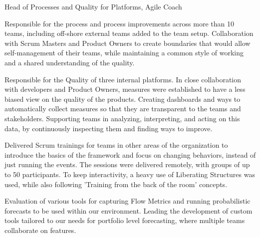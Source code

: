 \begin{cventries}
	\cventry
	{
		{			}
		{Head of Processes and Quality for Platforms, Agile Coach}
	} %
	{
	} %
	{
	} %
	{
	} %
	{
		\begin{cvitems}
			\item {
				{Responsible for the process and process improvements across more than 10 teams, including off-shore external teams added to the team setup. Collaboration with Scrum Masters and Product Owners to create boundaries that would allow self-management of their teams, while maintaining a common style of working and a shared understanding of the quality.  }
			}			
			\item {
				{Responsible for the Quality of three internal platforms. In close collaboration with developers and Product Owners, measures were established to have a less biased view on the quality of the products. Creating dashboards and ways to automatically collect measures so that they are transparent to the teams and stakeholders. Supporting teams in analyzing, interpreting, and acting on this data, by continuously inspecting them and finding ways to improve. }
			}	
			\item {
				{Delivered Scrum trainings for teams in other areas of the organization to introduce the basics of the framework and focus on changing behaviors, instead of just running the events. The sessions were delivered remotely, with groups of up to 50 participants. To keep interactivity, a heavy use of Liberating Structures was used, while also following 'Training from the back of the room' concepts. }
			}	
			\item {
				{Evaluation of various tools for capturing Flow Metrics and running probabilistic forecasts to be used within our environment. Leading the development of custom tools tailored to our needs for portfolio level forecasting, where multiple teams collaborate on features.}
			}			
		\end{cvitems}
	}	
	

\end{cventries}
